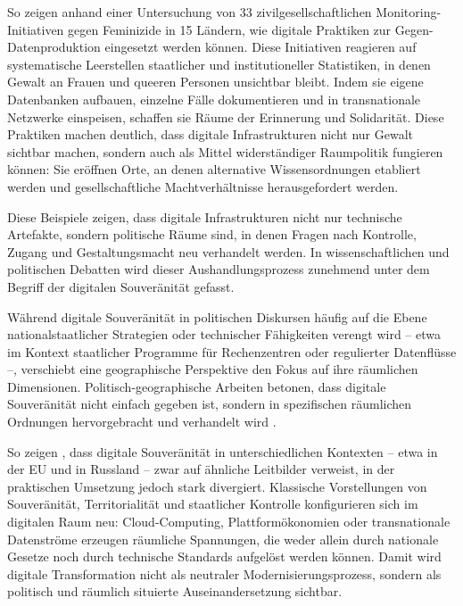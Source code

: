 So zeigen \textcite{dignazioGeographiesMissingData2024} anhand einer Untersuchung von 33 zivilgesellschaftlichen Monitoring-Initiativen gegen Feminizide in 15 Ländern, wie digitale Praktiken zur Gegen-Datenproduktion eingesetzt werden können. Diese Initiativen reagieren auf systematische Leerstellen staatlicher und institutioneller Statistiken, in denen Gewalt an Frauen und queeren Personen unsichtbar bleibt. Indem sie eigene Datenbanken aufbauen, einzelne Fälle dokumentieren und in transnationale Netzwerke einspeisen, schaffen sie Räume der Erinnerung und Solidarität. Diese Praktiken machen deutlich, dass digitale Infrastrukturen nicht nur Gewalt sichtbar machen, sondern auch als Mittel widerständiger Raumpolitik fungieren können: Sie eröffnen Orte, an denen alternative Wissensordnungen etabliert werden und gesellschaftliche Machtverhältnisse herausgefordert werden.

Diese Beispiele zeigen, dass digitale Infrastrukturen nicht nur technische Artefakte, sondern politische Räume sind, in denen Fragen nach Kontrolle, Zugang und Gestaltungsmacht neu verhandelt werden. In wissenschaftlichen und politischen Debatten wird dieser Aushandlungsprozess zunehmend unter dem Begriff der digitalen Souveränität gefasst.

Während digitale Souveränität in politischen Diskursen häufig auf die Ebene nationalstaatlicher Strategien oder technischer Fähigkeiten verengt wird -- etwa im Kontext staatlicher Programme für Rechenzentren oder regulierter Datenflüsse --, verschiebt eine geographische Perspektive den Fokus auf ihre räumlichen Dimensionen. Politisch-geographische Arbeiten betonen, dass digitale Souveränität nicht einfach gegeben ist, sondern in spezifischen räumlichen Ordnungen hervorgebracht und verhandelt wird \parencite{glaszeContestedSpatialitiesDigital2023}.

So zeigen \textcite{glaszeContestedSpatialitiesDigital2023}, dass digitale Souveränität in unterschiedlichen Kontexten -- etwa in der EU und in Russland -- zwar auf ähnliche Leitbilder verweist, in der praktischen Umsetzung jedoch stark divergiert. Klassische Vorstellungen von Souveränität, Territorialität und staatlicher Kontrolle konfigurieren sich im digitalen Raum neu: Cloud-Computing, Plattformökonomien oder transnationale Datenströme erzeugen räumliche Spannungen, die weder allein durch nationale Gesetze noch durch technische Standards aufgelöst werden können. Damit wird digitale Transformation nicht als neutraler Modernisierungsprozess, sondern als politisch und räumlich situierte Auseinandersetzung sichtbar.

